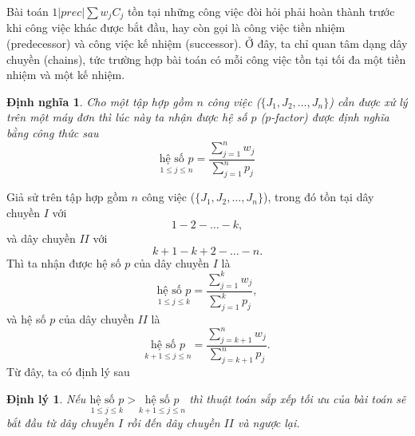 \documentclass[12pt,a4paper]{report}
\newtheorem{dn}{Định nghĩa}
\newtheorem{dl}{Định lý}
\begin{document}
Bài toán $1|prec|\sum w_j C_j$ tồn tại những công việc đòi hỏi phải hoàn thành trước khi công việc khác được bắt đầu, hay còn gọi là công việc tiền nhiệm (predecessor) và công việc kế nhiệm (successor). Ở đây, ta chỉ quan tâm dạng dây chuyền (chains), tức trường hợp bài toán có mỗi công việc tồn tại tối đa một tiền nhiệm và một kế nhiệm.

\begin{dn}
Cho một tập hợp gồm $n$ công việc ($\{J_1, J_2, …, J_n\}$) cần được xử lý trên một máy đơn thì lúc này ta nhận được hệ số $p$ ($p$-factor) được định nghĩa bằng công thức sau
\begin{equation}
	\underset{1 \leq j \leq n}{\text{hệ số }p} = \frac{\sum_{j=1}^n w_j}{\sum_{j=1}^n p_j}
\end{equation}
\end{dn}

Giả sử trên tập hợp gồm $n$ công việc ($\{J_1, J_2, …, J_n\}$), trong đó tồn tại dây chuyền $I$ với
\begin{equation*}
1 - 2 - \ldots - k,
\end{equation*}
và dây chuyền $II$ với
\begin{equation*}
k+1 - k+2 - \ldots - n.
\end{equation*}
Thì ta nhận được hệ số $p$ của dây chuyền $I$ là
\begin{equation}
	\underset{1 \leq j \leq k}{\text{hệ số }p} = \frac{\sum_{j=1}^k w_j}{\sum_{j=1}^k p_j},
\end{equation}
và hệ số $p$ của dây chuyền $II$ là
\begin{equation}
	\underset{k+1 \leq j \leq n}{\text{hệ số }p} = \frac{\sum_{j=k+1}^n w_j}{\sum_{j=k+1}^n p_j}.
\end{equation}
Từ đây, ta có định lý sau
\begin{dl} \label{daychuyen}
	Nếu $\underset{1 \leq j \leq k}{\text{hệ số }p} > \underset{k+1 \leq j \leq n}{\text{hệ số }p}$ thì thuật toán sắp xếp tối ưu của bài toán sẽ bắt đầu từ dây chuyền $I$ rồi đến dây chuyền $II$ và ngược lại.
\end{dl}
\end{document}
